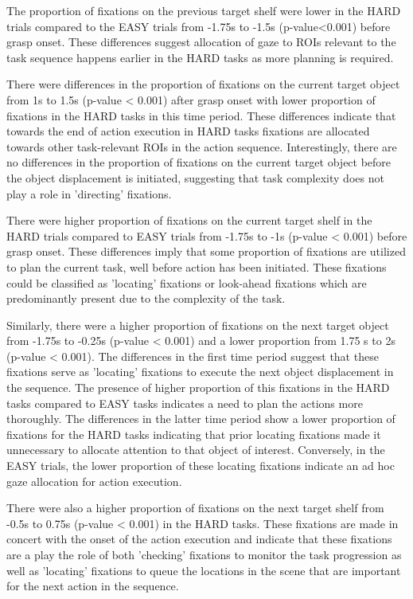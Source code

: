 The proportion of fixations on the previous target shelf were lower in the HARD trials compared to the EASY trials from -1.75s to -1.5s (p-value<0.001) before grasp onset. These differences suggest allocation of gaze to ROIs relevant to the task sequence happens earlier in the HARD tasks as more planning is required.

There were differences in the proportion of fixations on the current target object from 1s to 1.5s (p-value < 0.001) after grasp onset with lower proportion of fixations in the HARD tasks in this time period. These differences indicate that towards the end of action execution in HARD tasks fixations are allocated towards other task-relevant ROIs in the action sequence. Interestingly, there are no differences in the proportion of fixations on the current target object before the object displacement is initiated, suggesting that task complexity does not play a role in 'directing' fixations. 

There were higher proportion of fixations on the current target shelf in the HARD trials compared to EASY trials from -1.75s to -1s (p-value < 0.001) before grasp onset. These differences imply that some proportion of fixations are utilized to plan the current task, well before action has been initiated. These fixations could be classified as 'locating' fixations or look-ahead fixations which are predominantly present due to the complexity of the task. 

Similarly, there were a higher proportion of fixations on the next target object from -1.75s to -0.25s (p-value < 0.001) and a lower proportion from 1.75 s to 2s (p-value < 0.001). The differences in the first time period suggest that these fixations serve as 'locating' fixations to execute the next object displacement in the sequence. The presence of higher proportion of this fixations in the HARD tasks compared to EASY tasks indicates a need to plan the actions more thoroughly. The differences in the latter time period show a lower proportion of fixations for the HARD tasks indicating that prior locating fixations made it unnecessary to allocate attention to that object of interest. Conversely, in the EASY trials, the lower proportion of these locating fixations indicate an ad hoc gaze allocation for action execution.

There were also a higher proportion of fixations on the next target shelf from -0.5s to 0.75s (p-value < 0.001) in the HARD tasks. These fixations are made in concert with the onset of the action execution and indicate that these fixations are a play the role of both 'checking' fixations to monitor the task progression as well as 'locating' fixations to queue the locations in the scene that are important for the next action in the sequence.

